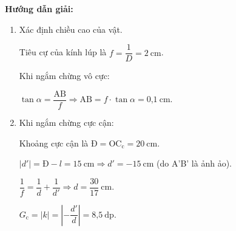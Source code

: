{\begin{center}
	\textbf{Hướng dẫn giải:}
\end{center}

 
	\begin{enumerate}
	\item Xác định chiều cao của vật.
	
	Tiêu cự của kính lúp là $f=\dfrac{1}{D}=2 \ \text{cm}$.
	
	Khi ngắm chừng vô cực: 
	
	$\tan \alpha=\dfrac{\text{AB}}{f}\Rightarrow \text{AB}=f\cdot \tan \alpha=\text{0,1} \ \text{cm}$.	
	\item 	Khi ngắm chừng cực cận:
	
	Khoảng cực cận là $\text{Đ}=\text{OC}_\text{c}=20 \ \text{cm}$.
	
    $|d'|=\text{Đ}-l=15\ \text{cm}\Rightarrow d'=-15\ \text{cm}$ (do A'B' là ảnh ảo).
    
    $\dfrac{1}{f}=\dfrac{1}{d}+\dfrac{1}{d'}\Rightarrow d=\dfrac{30}{17}\ \text{cm} $.
    
    	$G_\text{c}=|k|=\left|-\dfrac{d'}{d} \right|=\text{8,5}\ \text{dp}$. 
	
\end{enumerate}

}

